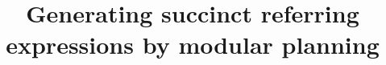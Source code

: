 \documentclass[11pt]{article}
\title{Generating succinct referring expressions by modular planning}
\author{}
\date{}
\begin{document}
\maketitle
\begin{abstract}

\end{abstract}














\end{document}
